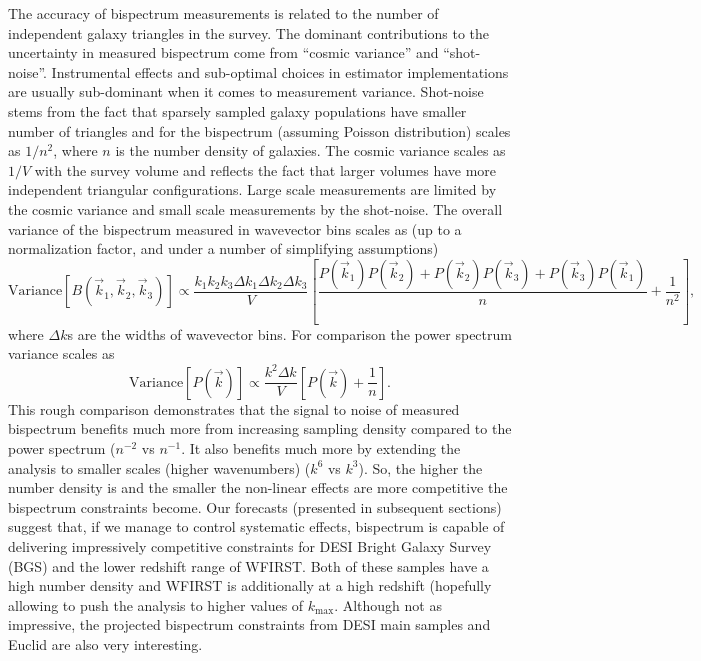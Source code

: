 The accuracy of bispectrum measurements is related to the number of independent galaxy triangles in the survey.
The dominant contributions to the uncertainty in measured bispectrum come from ``cosmic variance'' and ``shot-noise''. Instrumental effects and
sub-optimal choices in estimator implementations are usually sub-dominant when it comes to measurement variance. Shot-noise stems from the fact
that sparsely sampled galaxy populations have smaller number of triangles and for the bispectrum (assuming Poisson distribution) scales as 
$1/n^2$, where $n$ is the number density of galaxies. The cosmic variance scales as $1/V$ with the survey volume and reflects the fact that
larger volumes have more independent triangular configurations. Large scale measurements are limited by the cosmic variance and small scale measurements
by the shot-noise. The overall variance of the bispectrum measured in wavevector bins scales as (up to a normalization factor, and under a number of
simplifying assumptions)
\begin{equation}
    \mathrm{Variance}\left[B(\vec{k}_1,\vec{k}_2,\vec{k}_3)\right] \propto \frac{k_1k_2k_3\Delta k_1\Delta k_2\Delta k_3}{V}\left[\frac{P(\vec{k}_1)P(\vec{k}_2) + P(\vec{k}_2)P(\vec{k}_3) + P(\vec{k}_3)P(\vec{k}_1)}{n} + \frac{1}{n^2}\right],
\end{equation}
where $\Delta k$s are the widths of wavevector bins. For comparison the power spectrum variance scales as
\begin{equation}
    \mathrm{Variance}\left[P(\vec{k})\right] \propto \frac{k^2\Delta k}{V}\left[P(\vec{k}) + \frac{1}{n}\right].
\end{equation}
This rough comparison demonstrates that the signal to noise of measured bispectrum benefits much more from increasing sampling density 
compared to the power spectrum ($n^{-2}$ vs $n^{-1}$. It also benefits much more by extending the analysis to smaller scales (higher wavenumbers)
($k^6$ vs $k^3$). So, the higher the number density is and the smaller the non-linear effects are more competitive the bispectrum constraints become.
Our forecasts (presented in subsequent sections) suggest that, if we manage to control systematic effects, bispectrum is capable of delivering impressively
competitive constraints for DESI Bright Galaxy Survey (BGS) and the lower redshift range of WFIRST. Both of these samples have a high number density
and WFIRST is additionally at a high redshift (hopefully allowing to push the analysis to higher values of $k_\mathrm{max}$.
Although not as impressive, the projected bispectrum constraints from DESI main samples and Euclid are also very interesting. 


